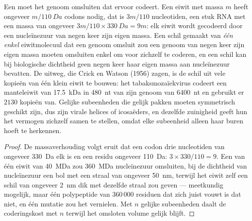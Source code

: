 \begin{proposition}\label{prop:b3:virology:economy}
Een  moet het genoom omsluiten dat ervoor codeert. Een eiwit met
massa $m$ heeft ongeveer $m/\qty{110}{Da}$ codons nodig, dat is
$3m/110$ nucleotiden, een stuk RNA met een massa van ongeveer
$3m/110\times\qty{330}{Da} = 9m$: elk eiwit wordt gecodeerd door een
nucleïnezuur van negen keer zijn eigen massa. Een schil gemaakt van
\emph{één enkel} eiwitmolecuul dat een genoom omsluit zou een genoom
van negen keer zijn eigen massa moeten omsluiten enkel om voor zichzelf
te coderen, en een schil kan bij biologische dichtheid geen negen keer
haar eigen massa aan nucleïnezuur bevatten. De uitweg, die Crick en
Watson (1956) zagen, is de schil uit vele kopieën van één klein eiwit
te bouwen: het tabaksmozaïekvirus codeert een manteleiwit van
\qty{17.5}{kDa} in \qty{480}{nt} van zijn genoom van \qty{6400}{nt} en
gebruikt er $2130$ kopieën van. Gelijke subeenheden die gelijk pakken
moeten symmetrisch geschikt zijn, dus zijn virale  helices of
icosaëders, en dezelfde zuinigheid geeft hun het vermogen zichzelf
samen te stellen, omdat elke subeenheid alleen haar buren hoeft te
herkennen.
\end{proposition}
\begin{proof}
De massaverhouding volgt eruit dat een codon drie nucleotiden van
ongeveer \qty{330}{Da} elk is en een residu ongeveer \qty{110}{Da}:
$3\times 330/110 =
9$. Een  van één eiwit van \qty{40}{MDa} zou \qty{360}{MDa}
nucleïnezuur omsluiten, bij de dichtheid van nucleïnezuur een bol met
een straal van ongeveer \qty{50}{nm}, terwijl het eiwit zelf een schil
van ongeveer \qty{2}{nm} dik met dezelfde straal zou geven ---
meetkundig mogelijk, maar één polypeptide van $360\,000$ residuen dat
zich juist vouwt is dat niet, en één mutatie zou het vernielen. Met $n$
gelijke subeenheden daalt de coderingskost met $n$ terwijl het
omsloten volume gelijk blijft.
\end{proof}

